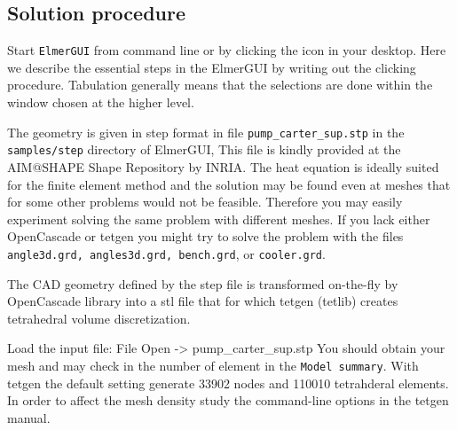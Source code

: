 \subsection*{Solution procedure}

Start \texttt{ElmerGUI} from command line or by clicking the icon in your desktop. Here we describe 
the essential steps in the ElmerGUI by writing out the clicking procedure. Tabulation generally means that the 
selections are done within the window chosen at the higher level. 

The geometry is given in step format in file \texttt{pump\_carter\_sup.stp}
in the \texttt{samples/step} directory of ElmerGUI, 
This file is kindly provided at the AIM@SHAPE Shape Repository by INRIA.
The heat equation is ideally suited for the finite element method and 
the solution may be found even at meshes that for some other problems
would not be feasible. Therefore you may easily experiment solving the same
problem with different meshes. If you lack either OpenCascade or tetgen you might try to solve the problem 
with the  files \texttt{angle3d.grd, angles3d.grd, 
bench.grd}, or \texttt{cooler.grd}.

The CAD geometry defined by the step file is transformed on-the-fly by OpenCascade library into 
a stl file that 
for which tetgen (tetlib) creates tetrahedral volume discretization.

Load the input file:
\ttbegin
File 
  Open -> pump_carter_sup.stp
\ttend
You should obtain your mesh and may check in the number of element in the \texttt{Model summary}. 
With tetgen the default setting generate 33902 nodes and 110010 tetrahderal elements.
In order to affect the mesh density study the command-line options in the tetgen manual.

